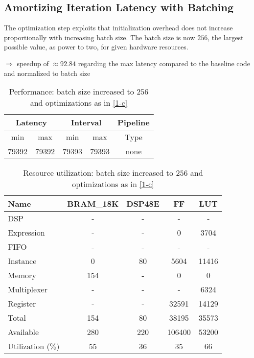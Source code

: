 \documentclass[../main.tex]{subfiles}
\begin{document}
	\subsection{Amortizing Iteration Latency with Batching}
	The optimization step exploits that initialization overhead does not increase proportionally with increasing batch size. The batch size is now $256$, the largest possible value, as power to two, for given hardware resources.

$\Rightarrow$ speedup of $\approx 92.84 $ regarding the max latency compared to the baseline code and normalized to batch size
	\begin{table}[H]
		\centering
		\begin{tabular}{ccccc}
			\multicolumn{2}{c}{Latency} & \multicolumn{2}{c}{Interval} & Pipeline\\
			\hline
			min  &   max  &   min  &   max  &   Type  \\
			79392&  79392&  79393&  79393&   none  
		\end{tabular}
		\caption{Performance:  batch size increased to $256$ and optimizations as in \ref{1-c}}
		\label{1-d-perf-table}
	\end{table}

	\begin{table}[H]
		\centering
		\begin{tabular}{lcccc}
			Name      & BRAM\_18K& DSP48E&   FF   &  LUT  \\
			\hline
			DSP              &        -&      -&       -&      -\\
			Expression       &        -&      -&       0&   3704\\
			FIFO             &        -&      -&       -&      -\\
			Instance         &        0&     80&    5604&  11416\\
			Memory           &      154&      -&       0&      0\\
			Multiplexer      &        -&      -&       -&   6324\\
			Register         &        -&      -&   32591&  14129\\
			\hline
			Total            &      154&     80&   38195&  35573\\
			Available        &      280&    220&  106400&  53200\\
			\hline
			Utilization ($\%$)  &       55&     36&      35&     66
		\end{tabular}
		\caption{Resource utilization: batch size increased to $256$ and optimizations as in \ref{1-c}}
		\label{1-d-resources}
	\end{table}
\end{document}
